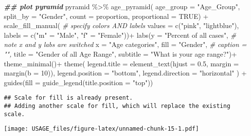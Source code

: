 \documentclass[
]{article}
\newenvironment{Shaded}{\begin{snugshade}}{\end{snugshade}}
\newcommand{\AttributeTok}[1]{\textcolor[rgb]{0.77,0.63,0.00}{#1}}
\newcommand{\CommentTok}[1]{\textcolor[rgb]{0.56,0.35,0.01}{\textit{#1}}}
\newcommand{\ConstantTok}[1]{\textcolor[rgb]{0.00,0.00,0.00}{#1}}
\newcommand{\DecValTok}[1]{\textcolor[rgb]{0.00,0.00,0.81}{#1}}
\newcommand{\DocumentationTok}[1]{\textcolor[rgb]{0.56,0.35,0.01}{\textbf{\textit{#1}}}}
\newcommand{\FloatTok}[1]{\textcolor[rgb]{0.00,0.00,0.81}{#1}}
\newcommand{\FunctionTok}[1]{\textcolor[rgb]{0.00,0.00,0.00}{#1}}
\newcommand{\NormalTok}[1]{#1}
\newcommand{\OtherTok}[1]{\textcolor[rgb]{0.56,0.35,0.01}{#1}}
\newcommand{\SpecialCharTok}[1]{\textcolor[rgb]{0.00,0.00,0.00}{#1}}
\newcommand{\StringTok}[1]{\textcolor[rgb]{0.31,0.60,0.02}{#1}}
\begin{document}
\begin{Shaded}
\begin{Highlighting}[]
\DocumentationTok{\#\# plot pyramid}
\NormalTok{pyramid }\SpecialCharTok{\%\textgreater{}\%}
  \FunctionTok{age\_pyramid}\NormalTok{(}
    \AttributeTok{age\_group =} \StringTok{"Age\_Group"}\NormalTok{,}
    \AttributeTok{split\_by =} \StringTok{"Gender"}\NormalTok{,}
    \AttributeTok{count =}\NormalTok{ proportion,}
    \AttributeTok{proportional =} \ConstantTok{TRUE}\NormalTok{) }\SpecialCharTok{+}
  \FunctionTok{scale\_fill\_manual}\NormalTok{(                             }\CommentTok{\# specify colors AND labels}
    \AttributeTok{values =} \FunctionTok{c}\NormalTok{(}\StringTok{"pink"}\NormalTok{, }\StringTok{"lightblue"}\NormalTok{),              }
    \AttributeTok{labels =} \FunctionTok{c}\NormalTok{(}\StringTok{"m"} \OtherTok{=} \StringTok{"Male"}\NormalTok{, }\StringTok{"f"} \OtherTok{=} \StringTok{"Female"}\NormalTok{))}\SpecialCharTok{+}
  \FunctionTok{labs}\NormalTok{(}\AttributeTok{y =} \StringTok{"Percent of all cases"}\NormalTok{,              }\CommentTok{\# note x and y labs are switched}
       \AttributeTok{x =} \StringTok{"Age categories"}\NormalTok{,                          }
       \AttributeTok{fill =} \StringTok{"Gender"}\NormalTok{, }
       \CommentTok{\# caption = "",}
       \AttributeTok{title =} \StringTok{"Gender of all Age Range"}\NormalTok{,}
       \AttributeTok{subtitle =} \StringTok{"What is your age range?"}\NormalTok{)}\SpecialCharTok{+}
  \FunctionTok{theme\_minimal}\NormalTok{()}\SpecialCharTok{+}
  \FunctionTok{theme}\NormalTok{(}
    \AttributeTok{legend.title =} \FunctionTok{element\_text}\NormalTok{(}\AttributeTok{hjust =} \FloatTok{0.5}\NormalTok{, }\AttributeTok{margin =} \FunctionTok{margin}\NormalTok{(}\AttributeTok{b =} \DecValTok{10}\NormalTok{)),}
    \AttributeTok{legend.position =} \StringTok{"bottom"}\NormalTok{,}
    \AttributeTok{legend.direction =} \StringTok{"horizontal"}
\NormalTok{  ) }\SpecialCharTok{+}
  \FunctionTok{guides}\NormalTok{(}\AttributeTok{fill =} \FunctionTok{guide\_legend}\NormalTok{(}\AttributeTok{title.position =} \StringTok{"top"}\NormalTok{))}
\end{Highlighting}
\end{Shaded}

\begin{verbatim}
## Scale for fill is already present.
## Adding another scale for fill, which will replace the existing scale.
\end{verbatim}

\texttt{[image: USAGE\_files/figure-latex/unnamed-chunk-15-1.pdf]}
\end{document}
